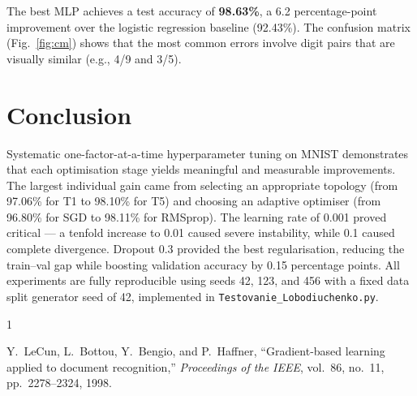 \documentclass[journal,onecolumn]{IEEEtran}
\begin{document}
The best MLP achieves a test accuracy of \textbf{98.63\%}, a 6.2
percentage-point improvement over the logistic regression baseline
(92.43\%). The confusion matrix (Fig.~\ref{fig:cm}) shows that the most
common errors involve digit pairs that are visually similar (e.g., 4/9
and 3/5).

\section{Conclusion}

Systematic one-factor-at-a-time hyperparameter tuning on MNIST demonstrates
that each optimisation stage yields meaningful and measurable improvements.
The largest individual gain came from selecting an appropriate topology
(from 97.06\% for T1 to 98.10\% for T5) and choosing an adaptive
optimiser (from 96.80\% for SGD to 98.11\% for RMSprop).
The learning rate of 0.001 proved critical — a tenfold increase to 0.01
caused severe instability, while 0.1 caused complete divergence.
Dropout 0.3 provided the best regularisation, reducing the train--val gap
while boosting validation accuracy by 0.15 percentage points.
All experiments are fully reproducible using seeds 42, 123, and 456 with
a fixed data split generator seed of 42, implemented in
\texttt{Testovanie\_Lobodiuchenko.py}.

\begin{thebibliography}{1}

Y.~LeCun, L.~Bottou, Y.~Bengio, and P.~Haffner,
``Gradient-based learning applied to document recognition,''
\emph{Proceedings of the IEEE}, vol.~86, no.~11, pp.~2278--2324, 1998.

\end{thebibliography}
\end{document}
